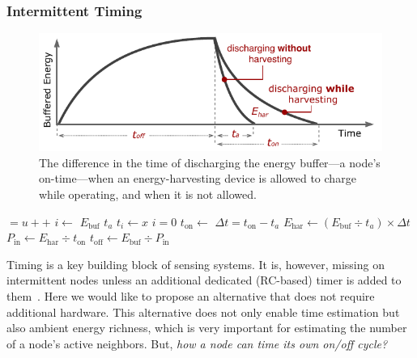 \subsubsection{Intermittent Timing}
\label{subsec:interTimer}
%
\begin{figure}[t]
		\centering
		\includegraphics[width=\columnwidth]{figures/softwareClock}
		\caption{The difference in the time of discharging the energy buffer---a node's on-time---when an energy-harvesting device is allowed to charge while operating, and when it is not allowed.}
		\label{fig:softwareClock}
\end{figure} 
\begin{algorithm}[t]
    \label{algo:offTime}
    \small
    \begin{algorithmic}[1]
		\State {} $= u{+}{+}$ 
			\State $i \leftarrow $   \label{lin:i}
		\State $E_\text{buf}$ 
			\State $t_a$ \label{lin:ta}
		\State$ t_{i} \leftarrow x $ 
		    \State $i=0$
			\State {}  \label{lin:fixedLoad}
			\State \label{lin:ontime} $t_\text{on} \leftarrow$  \label{lin:ton}
		\EndIf
			\State \label{lin:deltat}$\Delta{t} = t_\text{on}-t_a$   \label{lin:td}
			\State \label{lin:ehar}$E_\text{har} \leftarrow (E_\text{buf}\div t_a)\times\Delta{t}$ 
			\State $P_\text{in} \leftarrow E_\text{har}\div{t_\text{on}}$  \label{lin:pin}
			\State \label{lin:offtime}$t_\text{off} \leftarrow E_\text{buf}\div P_\text{in}$ 
		\EndIf
	\end{algorithmic}
\end{algorithm}
%
Timing is a key building block of sensing systems. It is, however, missing on intermittent nodes unless an additional dedicated (RC-based) timer is added to them~\cite{hester2017timely}. Here we would like to propose an alternative that does not require additional hardware. This alternative does not only enable time estimation but also ambient energy richness, which is very important for estimating the number of a node's active neighbors. But, \textit{how a node can time its own on/off cycle?}

